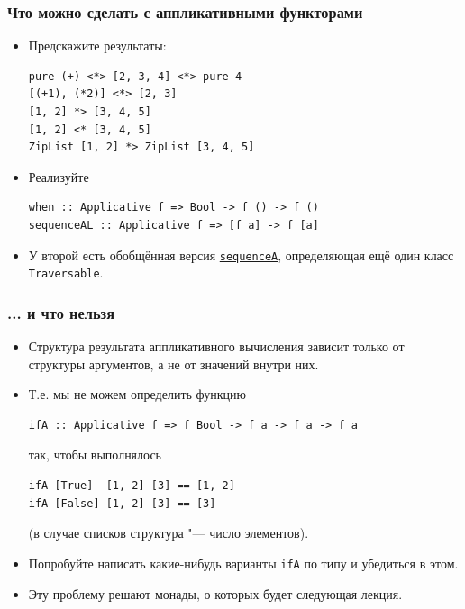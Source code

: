 \documentclass[11pt]{beamer}
\begin{document}
\begin{frame}[fragile]
  \frametitle{Что можно сделать с аппликативными функторами}
  \begin{itemize}
    \item Предскажите результаты:
          \begin{lstlisting}[basicstyle=\ttfamily\small]
pure (+) <*> [2, 3, 4] <*> pure 4
[(+1), (*2)] <*> [2, 3]
[1, 2] *> [3, 4, 5]
[1, 2] <* [3, 4, 5]
ZipList [1, 2] *> ZipList [3, 4, 5]
\end{lstlisting}
          \pause
    \item Реализуйте
          \begin{lstlisting}[basicstyle=\ttfamily\small]
when :: Applicative f => Bool -> f () -> f ()    
sequenceAL :: Applicative f => [f a] -> f [a]
\end{lstlisting}
    \item У второй есть обобщённая версия \href{http://hackage.haskell.org/package/base-4.12.0.0/docs/Data-Traversable.html#v:sequenceA}{\lstinline|sequenceA|}, определяющая ещё один класс \lstinline|Traversable|.
  \end{itemize}
\end{frame}

\begin{frame}[fragile]
  \frametitle{... и что нельзя}
  \begin{itemize}
    \item Структура результата аппликативного вычисления зависит только от структуры аргументов, а не от значений внутри них.
    \item Т.е. мы не можем определить функцию
          \begin{lstlisting}[basicstyle=\ttfamily\small]
ifA :: Applicative f => f Bool -> f a -> f a -> f a
\end{lstlisting}
          так, чтобы выполнялось
          \begin{lstlisting}[basicstyle=\ttfamily\small]
ifA [True]  [1, 2] [3] == [1, 2]
ifA [False] [1, 2] [3] == [3]
\end{lstlisting}
          (в случае списков структура "--- число элементов).
          \pause
    \item Попробуйте написать какие-нибудь варианты \lstinline|ifA| по типу и убедиться в этом.
          \pause
    \item Эту проблему решают монады, о которых будет следующая лекция.
  \end{itemize}
\end{frame}
\end{document}
